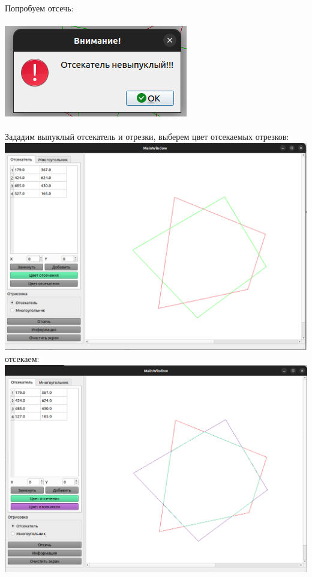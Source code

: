 \documentclass[a4paper,12pt]{article}
\begin{document}
	\noindent Попробуем отсечь:\\\\
	\includegraphics[width=\linewidth]{errorpol}\\\\
	\newpage
	\noindent Зададим выпуклый отсекатель и отрезки, выберем цвет отсекаемых отрезков:\\
	\includegraphics[width=\linewidth]{normalpol}\\
	отсекаем:\\
	\includegraphics[width=\linewidth]{res}
\end{document}
